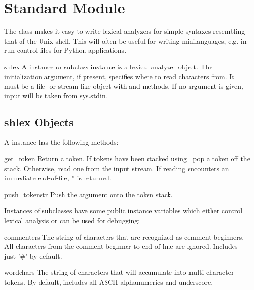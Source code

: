 \section{Standard Module }
\label{module-shlex}

The  class makes it easy to write lexical analyzers for
simple syntaxes resembling that of the Unix shell.  This will often
be useful for writing minilanguages, e.g. in run control files for
Python applications.

\begin{classdesc}{shlex}{}
A  instance or subclass instance is a lexical analyzer
object.  The initialization argument, if present, specifies where to
read characters from. It must be a file- or stream-like object with
 and  methods.  If no argument is given,
input will be taken from sys.stdin.

\end{classdesc}

\subsection{shlex Objects}
\label{shlex-objects}

A  instance has the following methods:

\begin{methoddesc}{get_token}{}
Return a token.  If tokens have been stacked using ,
pop a token off the stack.  Otherwise, read one from the input stream.
If reading encounters an immediate end-of-file, '' is returned.
\end{methoddesc}

\begin{methoddesc}{push_token}{str}
Push the argument onto the token stack.
\end{methoddesc}

Instances of  subclasses have some public instance
variables which either control lexical analysis or can be used
for debugging:

\begin{memberdesc}{commenters}
The string of characters that are recognized as comment beginners.
All characters from the comment beginner to end of line are ignored.
Includes just '#' by default.   
\end{memberdesc}

\begin{memberdesc}{wordchars}
The string of characters that will accumulate into multi-character
tokens. By default, includes all ASCII alphanumerics and underscore.
\end{memberdesc}

